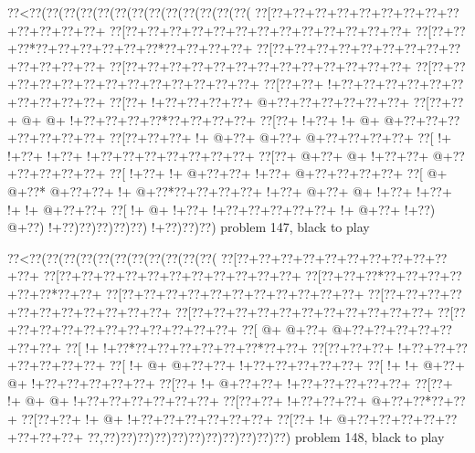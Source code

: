 \vbox{\vbox{\goo
\0??<\0??(\0??(\0??(\0??(\0??(\0??(\0??(\0??(\0??(\0??(\0??(\0??(\0??(
\0??[\0??+\0??+\0??+\0??+\0??+\0??+\0??+\0??+\0??+\0??+\0??+\0??+\0??+
\0??[\0??+\0??+\0??+\0??+\0??+\0??+\0??+\0??+\0??+\0??+\0??+\0??+\0??+
\0??[\0??+\0??+\0??*\0??+\0??+\0??+\0??+\0??+\0??*\0??+\0??+\0??+\0??+
\0??[\0??+\0??+\0??+\0??+\0??+\0??+\0??+\0??+\0??+\0??+\0??+\0??+\0??+
\0??[\0??+\0??+\0??+\0??+\0??+\0??+\0??+\0??+\0??+\0??+\0??+\0??+\0??+
\0??[\0??+\0??+\0??+\0??+\0??+\0??+\0??+\0??+\0??+\0??+\0??+\0??+\0??+
\0??[\0??+\0??+\- !+\0??+\0??+\0??+\0??+\0??+\0??+\0??+\0??+\0??+\0??+
\0??[\0??+\- !+\0??+\0??+\0??+\0??+\- @+\0??+\0??+\0??+\0??+\0??+\0??+
\0??[\0??+\0??+\- @+\- @+\- !+\0??+\0??+\0??+\0??*\0??+\0??+\0??+\0??+
\0??[\0??+\- !+\0??+\- !+\- @+\- @+\0??+\0??+\0??+\0??+\0??+\0??+\0??+
\0??[\0??+\0??+\0??+\- !+\- @+\0??+\- @+\0??+\- @+\0??+\0??+\0??+\0??+
\0??[\- !+\- !+\0??+\- !+\0??+\- !+\0??+\0??+\0??+\0??+\0??+\0??+\0??+
\0??[\0??+\- @+\0??+\- @+\- !+\0??+\0??+\- @+\0??+\0??+\0??+\0??+\0??+
\0??[\- !+\0??+\- !+\- @+\0??+\0??+\- !+\0??+\- @+\0??+\0??+\0??+\0??+
\0??[\- @+\- @+\0??*\- @+\0??+\0??+\- !+\- @+\0??*\0??+\0??+\0??+\0??+
\- !+\0??+\- @+\0??+\- @+\- !+\0??+\- !+\0??+\- !+\- !+\- @+\0??+\0??+
\0??[\- !+\- @+\- !+\0??+\- !+\0??+\0??+\0??+\0??+\0??+\- !+\- @+\0??+
\- !+\0??)\- @+\0??)\- !+\0??)\0??)\0??)\0??)\0??)\- !+\0??)\0??)\0??)
}
\hfil problem 147, black to play\hfil\break
}

\vbox{\vbox{\goo
\0??<\0??(\0??(\0??(\0??(\0??(\0??(\0??(\0??(\0??(\0??(\0??(
\0??[\0??+\0??+\0??+\0??+\0??+\0??+\0??+\0??+\0??+\0??+\0??+
\0??[\0??+\0??+\0??+\0??+\0??+\0??+\0??+\0??+\0??+\0??+\0??+
\0??[\0??+\0??+\0??*\0??+\0??+\0??+\0??+\0??+\0??*\0??+\0??+
\0??[\0??+\0??+\0??+\0??+\0??+\0??+\0??+\0??+\0??+\0??+\0??+
\0??[\0??+\0??+\0??+\0??+\0??+\0??+\0??+\0??+\0??+\0??+\0??+
\0??[\0??+\0??+\0??+\0??+\0??+\0??+\0??+\0??+\0??+\0??+\0??+
\0??[\0??+\0??+\0??+\0??+\0??+\0??+\0??+\0??+\0??+\0??+\0??+
\0??[\- @+\- @+\0??+\- @+\0??+\0??+\0??+\0??+\0??+\0??+\0??+
\0??[\- !+\- !+\0??*\0??+\0??+\0??+\0??+\0??+\0??*\0??+\0??+
\0??[\0??+\0??+\0??+\- !+\0??+\0??+\0??+\0??+\0??+\0??+\0??+
\0??[\- !+\- @+\- @+\0??+\0??+\- !+\0??+\0??+\0??+\0??+\0??+
\0??[\- !+\- !+\- @+\0??+\- @+\- !+\0??+\0??+\0??+\0??+\0??+
\0??[\0??+\- !+\- @+\0??+\0??+\- !+\0??+\0??+\0??+\0??+\0??+
\0??[\0??+\- !+\- @+\- @+\- !+\0??+\0??+\0??+\0??+\0??+\0??+
\0??[\0??+\0??+\- !+\0??+\0??+\0??+\- @+\0??+\0??*\0??+\0??+
\0??[\0??+\0??+\- !+\- @+\- !+\0??+\0??+\0??+\0??+\0??+\0??+
\0??[\0??+\- !+\- @+\0??+\0??+\0??+\0??+\0??+\0??+\0??+\0??+
\0??,\0??)\0??)\0??)\0??)\0??)\0??)\0??)\0??)\0??)\0??)\0??)
}
\hfil problem 148, black to play\hfil\break
}

